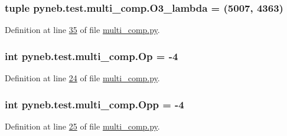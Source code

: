 \hypertarget{namespacepyneb_1_1test_1_1multi__comp_ab480689bf8f9614cc0a70a5613489c99}{}
\subsubsection[{O3\+\_\+lambda}]{\setlength{\rightskip}{0pt plus 5cm}tuple pyneb.\+test.\+multi\+\_\+comp.\+O3\+\_\+lambda = (5007, 4363)}\label{namespacepyneb_1_1test_1_1multi__comp_ab480689bf8f9614cc0a70a5613489c99}


Definition at line \hyperlink{multi__comp_8py_source_l00035}{35} of file \hyperlink{multi__comp_8py_source}{multi\+\_\+comp.\+py}.

\hypertarget{namespacepyneb_1_1test_1_1multi__comp_acb5b32b16511efc23433aaade5b41544}{}
\subsubsection[{Op}]{\setlength{\rightskip}{0pt plus 5cm}int pyneb.\+test.\+multi\+\_\+comp.\+Op = -\/4}\label{namespacepyneb_1_1test_1_1multi__comp_acb5b32b16511efc23433aaade5b41544}


Definition at line \hyperlink{multi__comp_8py_source_l00024}{24} of file \hyperlink{multi__comp_8py_source}{multi\+\_\+comp.\+py}.

\hypertarget{namespacepyneb_1_1test_1_1multi__comp_abd16a9dd120d958a9edbf2ec1322c026}{}
\subsubsection[{Opp}]{\setlength{\rightskip}{0pt plus 5cm}int pyneb.\+test.\+multi\+\_\+comp.\+Opp = -\/4}\label{namespacepyneb_1_1test_1_1multi__comp_abd16a9dd120d958a9edbf2ec1322c026}


Definition at line \hyperlink{multi__comp_8py_source_l00025}{25} of file \hyperlink{multi__comp_8py_source}{multi\+\_\+comp.\+py}.

\hypertarget{namespacepyneb_1_1test_1_1multi__comp_a8d90734f103bcd80bced4c908bfeb493}{}
